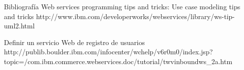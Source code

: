 Bibliografía
Web services programming tips and tricks: Use case modeling tips and tricks
http://www.ibm.com/developerworks/webservices/library/ws-tip-uml2.html

Definir un servicio Web de registro de usuarios
http://publib.boulder.ibm.com/infocenter/wchelp/v6r0m0/index.jsp?topic=/com.ibm.commerce.webservices.doc/tutorial/twvinboundws_2a.htm

